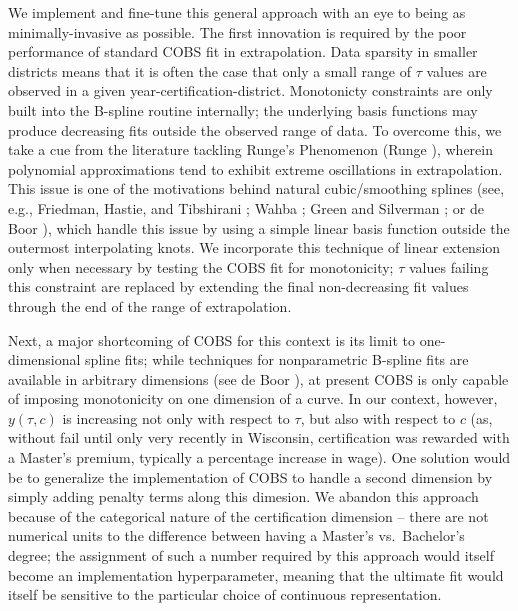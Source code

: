 We implement and fine-tune this general approach with an eye to being as
minimally-invasive as possible. The first innovation is required by the
poor performance of standard COBS fit in extrapolation. Data sparsity in
smaller districts means that it is often the case that only a small
range of \(\tau\) values are observed in a given
year-certification-district. Monotonicty constraints are only built into
the B-spline routine internally; the underlying basis functions may
produce decreasing fits outside the observed range of data. To overcome
this, we take a cue from the literature tackling Runge's Phenomenon
(Runge \citeyear{runge}), wherein polynomial
approximations tend to exhibit extreme oscillations in extrapolation.
This issue is one of the motivations behind natural cubic/smoothing
splines (see, e.g., Friedman, Hastie, and Tibshirani
\citeyear{friedman}; Wahba
\citeyear{wahba}; Green and Silverman
\citeyear{green}; or de Boor
\citeyear{deboor}), which handle this issue by using
a simple linear basis function outside the outermost interpolating
knots. We incorporate this technique of linear extension only when
necessary by testing the COBS fit for monotonicity; \(\tau\) values
failing this constraint are replaced by extending the final
non-decreasing fit values through the end of the range of extrapolation.

Next, a major shortcoming of COBS for this context is its limit to
one-dimensional spline fits; while techniques for nonparametric B-spline
fits are available in arbitrary dimensions (see de Boor
\citeyear{deboor}), at present COBS is only capable
of imposing monotonicity on one dimension of a curve. In our context,
however, \(y(\tau, c)\) is increasing not only with respect to \(\tau\),
but also with respect to \(c\) (as, without fail until only very
recently in Wisconsin, certification was rewarded with a Master's
premium, typically a percentage increase in wage). One solution would be
to generalize the implementation of COBS to handle a second dimension by
simply adding penalty terms along this dimesion. We abandon this
approach because of the categorical nature of the certification
dimension -- there are not numerical units to the difference between
having a Master's vs.~Bachelor's degree; the assignment of such a number
required by this approach would itself become an implementation
hyperparameter, meaning that the ultimate fit would itself be sensitive
to the particular choice of continuous representation.

